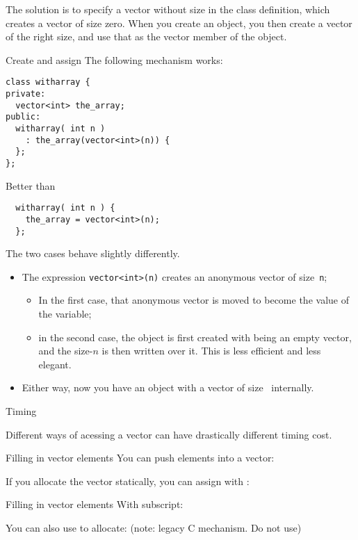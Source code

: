 The solution is to specify a vector without size in the class
definition, which creates a vector of size zero. When you create an
object, you then create a vector of the right size, and use that as
the vector member of the object.

\begin{block}{Create and assign}
  \label{sl:class-has-vector}
  The following mechanism works:
\begin{lstlisting}
class witharray {
private:
  vector<int> the_array;
public:
  witharray( int n )
    : the_array(vector<int>(n)) {
  };
};
\end{lstlisting}
Better than
\begin{lstlisting}
  witharray( int n ) {
    the_array = vector<int>(n);
  };
\end{lstlisting}
\end{block}

The two cases behave slightly differently.
\begin{itemize}
\item The expression \lstinline{vector<int>(n)} creates an anonymous vector
  of size~\lstinline{n};
  \begin{itemize}
  \item In the first case, that anonymous vector is moved to become
    the value of the  variable;
  \item in the second case, the object is first created with
     being an empty
    vector, and the size-$n$ is then written over it. This is less
    efficient and less elegant.
  \end{itemize}
\item Either way, now you have an object with a vector of size~ internally.
\end{itemize}

 {Timing}

Different ways of acessing a vector can have drastically different
timing cost.

\begin{block}{Filling in vector elements}
  \label{sl:vect-extend-code}
  You can push elements into a vector:

  If you allocate the vector statically, you can assign with :
\end{block}

\begin{block}{Filling in vector elements}
  \label{sl:vect-extend-code2}
  With subscript:

  You can also use  to allocate:
  (note: legacy C mechanism. Do not use)
\end{block}

